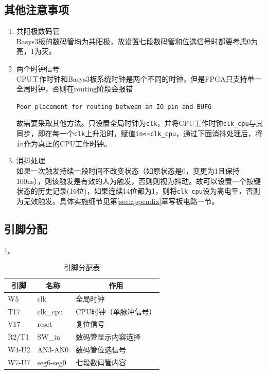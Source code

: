 \subsection{其他注意事项}
\begin{enumerate}
    \item 共阳极数码管\\
    Basys3板的数码管均为共阳极，故设置七段数码管和位选信号时都要考虑0为亮，1为灭。
    \item 两个时钟信号\\%
    CPU工作时钟和Basys3板系统时钟是两个不同的时钟，但是FPGA只支持单一全局时钟，否则在routing阶段会报错
    \begin{center}\verb'Poor placement for routing between an IO pin and BUFG'\end{center}
    故需要采取其他方法。只设置全局时钟为\verb'clk'，并将CPU工作时钟\verb'clk_cpu'与其同步，即在每一个\verb'clk'上升沿时，赋值\verb'in<=clk_cpu'，通过下面消抖处理后，将\verb'in'作为真正的CPU工作时钟。
    \item 消抖处理\\
    如果一次触发持续一段时间不改变状态（如原状态是0，变更为1且保持100ns），则该触发是有效的人为触发，否则则视为抖动。故可以设置一个按键状态的历史记录(16位)，如果连续14位都为1，则将\verb'clk_cpu'设为高电平，否则为无效触发。具体实施细节见第\ref{sec:appendix}章写板电路一节。
\end{enumerate}

\subsection{引脚分配}
\ref{tab:pin}。
\begin{table}[H]
  \centering\wuhao
  \caption{引脚分配表}
    \begin{tabular}{|l|l|l|}
    \hline
    \multicolumn{1}{|c|}{引脚} & \multicolumn{1}{c|}{名称} & \multicolumn{1}{c|}{作用} \bigstrut\\
    \hline
    W5    & clk   & 全局时钟 \bigstrut\\
    \hline
    T17   & clk\_cpu & CPU时钟（单脉冲信号） \bigstrut\\
    \hline
    V17   & reset & 复位信号 \bigstrut\\
    \hline
    R2/T1 & SW\_in & 数码管显示内容选择 \bigstrut\\
    \hline
    W4-U2 & AN3-AN0 & 数码管位选信号 \bigstrut\\
    \hline
    W7-U7 & seg6-seg0 & 七段数码管内容 \bigstrut\\
    \hline
    \end{tabular}%
  \label{tab:pin}%
\end{table}%

